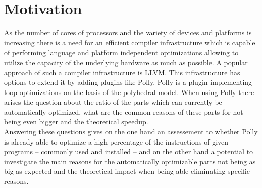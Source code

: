 \chapter{Motivation}
As the number of cores of processors and the variety of devices and platforms is increasing there is a need for an efficient compiler infrastructure which is capable of performing language and platform independent optimizations allowing to utilize the capacity of the underlying hardware as much as possible.
A popular approach of such a compiler infrastructure is LLVM. \cite{LLVMUsers}
This infrastructure has options to extend it by adding plugins like Polly.
Polly is a plugin implementing loop optimizations on the basis of the polyhedral model.
When using Polly there arises the question about the ratio of the parts which can currently be automatically optimized, what are the common reasons of these parts for not being even bigger and the theoretical speedup.\\
Answering these questions gives on the one hand an assessement to whether Polly is already able to optimize a high percentage of the instructions of given programs -- commonly used and installed -- and on the other hand a potential to investigate the main reasons for the automatically optimizable parts not being as big as expected and the theoretical impact when being able eliminating specific reasons.

